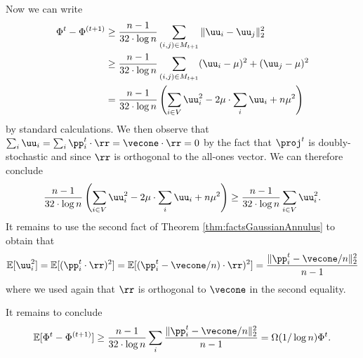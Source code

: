 Now we can write 
\begin{align*}
     \Phi^{t} - \Phi^{(t+1)} &\geq \frac{n-1}{32 \cdot \log n} \sum_{(i,j) \in M_{t+1}} \|\uu_i - \uu_j\|^2_2 \\
     &\geq  \frac{n-1}{32 \cdot \log n} \sum_{(i,j) \in M_{t+1}}  (\uu_i - \mu)^2 + (\uu_j - \mu)^2\\
     &=  \frac{n-1}{32 \cdot \log n}\left( \sum_{i \in V} \uu_i^2 - 2\mu \cdot \sum_i \uu_i + n \mu^2 \right)
\end{align*}
by standard calculations. We then observe that $\sum_i \uu_i = \sum_i \pp_i^t \cdot \rr = \vecone \cdot \rr = 0$ by the fact that $\proj^t$ is doubly-stochastic and since $\rr$ is orthogonal to the all-ones vector. We can therefore conclude 
\[
\frac{n-1}{32 \cdot \log n}\left( \sum_{i \in V} \uu_i^2 - 2\mu \cdot \sum_i \uu_i + n \mu^2 \right) \geq \frac{n-1}{32 \cdot \log n} \sum_{i \in V} \uu_i^2.
\]
It remains to use the second fact of Theorem \ref{thm:factsGaussianAnnulus} to obtain that 
\[
\mathbb{E}[\uu_i^2] = \mathbb{E}[(\pp_i^t \cdot \rr)^2] = \mathbb{E}[(\pp_i^t - \vecone/n) \cdot \rr)^2] = \frac{\|\pp_i^t - \vecone/n\|_2^2}{n-1}
\]
where we used again that $\rr$ is orthogonal to $\vecone$ in the second equality.

It remains to conclude 
\[
\mathbb{E}[\Phi^{t} - \Phi^{(t+1)}] \geq \frac{n-1}{32 \cdot \log n} \sum_{i} \frac{\|\pp_i^t - \vecone/n\|_2^2}{n-1} = \Omega(1/\log n) \Phi^t.
\]




